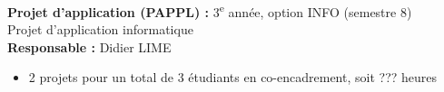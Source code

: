 \medskip\noindent
\textbf{Projet d'application (PAPPL) :} 3\textsuperscript{e} année, option INFO (semestre 8)\\
Projet d'application informatique\\
\textbf{Responsable :} Didier LIME

\begin{itemize}
  \item 2 projets pour un total de 3 étudiants en co-encadrement, soit ??? heures
\end{itemize}



